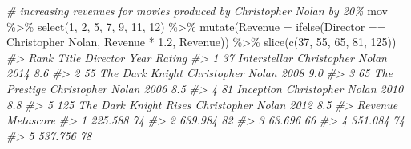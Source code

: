 \documentclass[
]{book}
\newenvironment{Shaded}{\begin{snugshade}}{\end{snugshade}}
\newcommand{\AttributeTok}[1]{\textcolor[rgb]{0.77,0.63,0.00}{#1}}
\newcommand{\CommentTok}[1]{\textcolor[rgb]{0.56,0.35,0.01}{\textit{#1}}}
\newcommand{\DecValTok}[1]{\textcolor[rgb]{0.00,0.00,0.81}{#1}}
\newcommand{\FloatTok}[1]{\textcolor[rgb]{0.00,0.00,0.81}{#1}}
\newcommand{\FunctionTok}[1]{\textcolor[rgb]{0.00,0.00,0.00}{#1}}
\newcommand{\NormalTok}[1]{#1}
\newcommand{\SpecialCharTok}[1]{\textcolor[rgb]{0.00,0.00,0.00}{#1}}
\newcommand{\StringTok}[1]{\textcolor[rgb]{0.31,0.60,0.02}{#1}}
\begin{document}
\begin{Shaded}
\begin{Highlighting}[]
\CommentTok{\# increasing revenues for movies produced by Christopher Nolan by 20\%}
\NormalTok{mov }\SpecialCharTok{\%\textgreater{}\%}
  \FunctionTok{select}\NormalTok{(}\DecValTok{1}\NormalTok{, }\DecValTok{2}\NormalTok{, }\DecValTok{5}\NormalTok{, }\DecValTok{7}\NormalTok{, }\DecValTok{9}\NormalTok{, }\DecValTok{11}\NormalTok{, }\DecValTok{12}\NormalTok{) }\SpecialCharTok{\%\textgreater{}\%}
  \FunctionTok{mutate}\NormalTok{(}\AttributeTok{Revenue =} \FunctionTok{ifelse}\NormalTok{(Director }\SpecialCharTok{==} \StringTok{\textquotesingle{}Christopher Nolan\textquotesingle{}}\NormalTok{, Revenue }\SpecialCharTok{*} \FloatTok{1.2}\NormalTok{, Revenue)) }\SpecialCharTok{\%\textgreater{}\%}
  \FunctionTok{slice}\NormalTok{(}\FunctionTok{c}\NormalTok{(}\DecValTok{37}\NormalTok{, }\DecValTok{55}\NormalTok{, }\DecValTok{65}\NormalTok{, }\DecValTok{81}\NormalTok{, }\DecValTok{125}\NormalTok{))}
\CommentTok{\#\textgreater{}   Rank                 Title          Director Year Rating}
\CommentTok{\#\textgreater{} 1   37          Interstellar Christopher Nolan 2014    8.6}
\CommentTok{\#\textgreater{} 2   55       The Dark Knight Christopher Nolan 2008    9.0}
\CommentTok{\#\textgreater{} 3   65          The Prestige Christopher Nolan 2006    8.5}
\CommentTok{\#\textgreater{} 4   81             Inception Christopher Nolan 2010    8.8}
\CommentTok{\#\textgreater{} 5  125 The Dark Knight Rises Christopher Nolan 2012    8.5}
\CommentTok{\#\textgreater{}   Revenue Metascore}
\CommentTok{\#\textgreater{} 1 225.588        74}
\CommentTok{\#\textgreater{} 2 639.984        82}
\CommentTok{\#\textgreater{} 3  63.696        66}
\CommentTok{\#\textgreater{} 4 351.084        74}
\CommentTok{\#\textgreater{} 5 537.756        78}


\end{Highlighting}
\end{Shaded}
\end{document}
